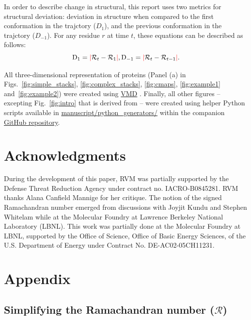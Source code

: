 \documentclass[fleqn,10pt,lineno]{wlpeerj} %
\newcommand{\Fig}[1]{Fig.~\ref{#1}}
\newcommand{\Figs}[1]{Figs.~\ref{#1}}
\newcommand{\n}[1]{{\color{red}#1}}
\begin{document}
\n{In order to describe change in structural, this report uses two metrics for structural deviation: deviation in structure when compared to the first conformation in the trajctory ($D_1$), and the previous conformation in the trajctory ($D_{-1}$). For any residue $r$ at time $t$, these equations can be described as follows:}
\begin{equation}
\textrm{D}_{1}  = \textcolor{red}{\mid} \mathcal{R}_{t}-\mathcal{R}_{1}   \textcolor{red}{\mid}, \\
\textrm{D}_{-1} = \textcolor{red}{\mid} \mathcal{R}_{t}-\mathcal{R}_{t-1} \textcolor{red}{\mid}.
\end{equation}

\n{All three-dimensional representation of proteins (Panel (a) in \Figs{fig:simple_stacks}, \ref{fig:complex_stacks}, \ref{fig:cmaps}, \ref{fig:example1} and~\ref{fig:example2}) were created using \href{http://www.ks.uiuc.edu/Research/vmd/}{VMD} \citep{Humphrey1996}. Finally, all other figures -- excepting \Fig{fig:intro} that is derived from \cite{Mannige2016} -- were created using helper Python scripts available in \href{https://github.com/ranjanmannige/backmap/blob/master/manuscript/python_generators/}{manuscript/python\_generators/} within the companion \href{https://github.com/ranjanmannige/backmap/}{GitHub repository}.}

\section*{Acknowledgments}

During the development of this paper, RVM was partially supported by the Defense Threat Reduction Agency under contract no. IACRO-B0845281. RVM thanks Alana Canfield Mannige for her critique. The notion of the signed Ramachandran number emerged from discussions with Joyjit Kundu and Stephen Whitelam while at the Molecular Foundry at Lawrence Berkeley National Laboratory (LBNL). This work was partially done at the Molecular Foundry at LBNL, supported by the Office of Science, Office of Basic Energy Sciences, of the U.S. Department of Energy under Contract No. DE-AC02-05CH11231.

\section*{Appendix}

\subsection*{Simplifying the Ramachandran number ($\mathcal{R}$)\label{sec:simplifyR}}
\end{document}
